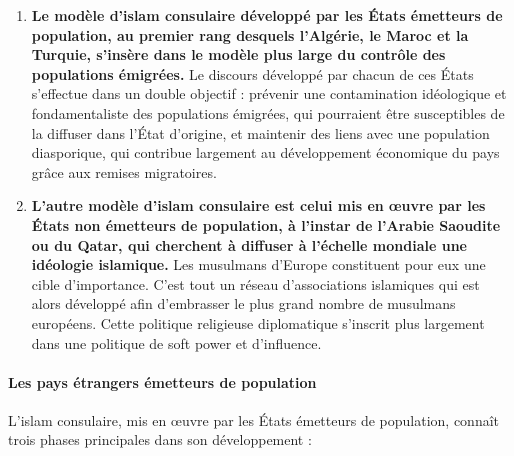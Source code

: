 \begin{enumerate}
\def\labelenumi{\alph{enumi}.}
\item
  
  \textbf{Le modèle d'islam consulaire développé par les États émetteurs
  de population, au premier rang desquels l'Algérie, le Maroc et la
  Turquie, s'insère dans le modèle plus large du contrôle des
  populations émigrées.} Le discours développé par chacun de ces États
  s'effectue dans un double objectif : prévenir une contamination
  idéologique et fondamentaliste des populations émigrées, qui
  pourraient être susceptibles de la diffuser dans l'État d'origine, et
  maintenir des liens avec une population diasporique, qui contribue
  largement au développement économique du pays grâce aux remises
  migratoires.
  
\item
  
  \textbf{L'autre modèle d'islam consulaire est celui mis en œuvre par
  les États non émetteurs de population, à l'instar de l'Arabie Saoudite
  ou du Qatar, qui cherchent à diffuser à l'échelle mondiale une
  idéologie islamique.} Les musulmans d'Europe constituent pour eux une
  cible d'importance. C'est tout un réseau d'associations islamiques qui
  est alors développé afin d'embrasser le plus grand nombre de musulmans
  européens. Cette politique religieuse diplomatique s'inscrit plus
  largement dans une politique de soft power et d'influence.
  
\end{enumerate}
 
    \paragraph{Les pays étrangers émetteurs de
    population} 


L'islam consulaire, mis en œuvre par les États émetteurs de population,
connaît trois phases principales dans son développement :



